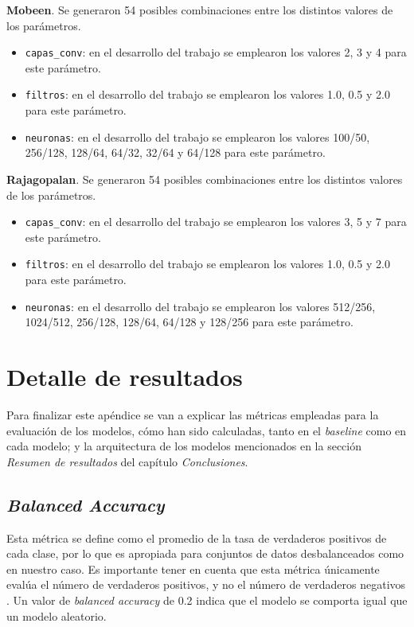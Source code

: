 \textbf{Mobeen}. Se generaron 54 posibles combinaciones entre los distintos valores de los parámetros.
\begin{itemize}
    \item \texttt{capas\_conv}: en el desarrollo del trabajo se emplearon los valores 2, 3 y 4 para este parámetro.
    \item \texttt{filtros}: en el desarrollo del trabajo se emplearon los valores 1.0, 0.5 y 2.0 para este parámetro.
    \item \texttt{neuronas}: en el desarrollo del trabajo se emplearon los valores 100/50, 256/128, 128/64, 64/32, 32/64 y 64/128 para este parámetro.
\end{itemize}

\textbf{Rajagopalan}. Se generaron 54 posibles combinaciones entre los distintos valores de los parámetros.
\begin{itemize}
    \item \texttt{capas\_conv}: en el desarrollo del trabajo se emplearon los valores 3, 5 y 7 para este parámetro.
    \item \texttt{filtros}: en el desarrollo del trabajo se emplearon los valores 1.0, 0.5 y 2.0 para este parámetro.
    \item \texttt{neuronas}: en el desarrollo del trabajo se emplearon los valores 512/256, 1024/512, 256/128, 128/64, 64/128 y 128/256 para este parámetro.
\end{itemize}

\section{Detalle de resultados}

Para finalizar este apéndice se van a explicar las métricas empleadas para la evaluación de los modelos, cómo han sido calculadas, tanto en el \textit{baseline} como en cada modelo; y la arquitectura de los modelos mencionados en la sección \textit{Resumen de resultados} del capítulo \textit{Conclusiones}.

\subsection{\textit{Balanced Accuracy}}

Esta métrica se define como el promedio de la tasa de verdaderos positivos de cada clase, por lo que es apropiada para conjuntos de datos desbalanceados como en nuestro caso. Es importante tener en cuenta que esta métrica únicamente evalúa el número de verdaderos positivos, y no el número de verdaderos negativos \cite{sklearn:balacc}. Un valor de \textit{balanced accuracy} de 0.2 indica que el modelo se comporta igual que un modelo aleatorio.

